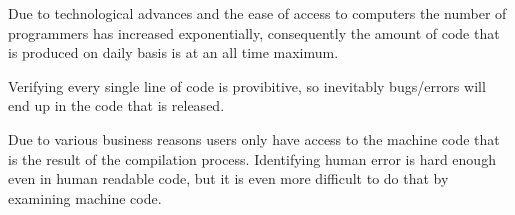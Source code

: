 Due to technological advances and the ease of access to computers the number
of programmers has increased exponentially, consequently the amount of code
that is produced on daily basis is at an all time maximum.

Verifying every single line of code is provibitive, so inevitably bugs/errors
will end up in the code that is released.

Due to various business reasons users only have access to the machine code that
is the result of the compilation process. Identifying human error is hard
enough even in human readable code, but it is even more difficult to do that
by examining machine code.

